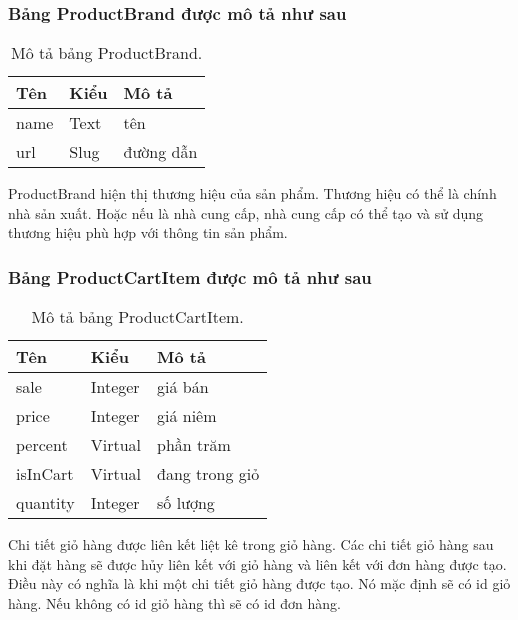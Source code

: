\subsubsection{Bảng ProductBrand được mô tả như sau}
\begin{table}[!htbp]\fontsize{13px}{13px}\selectfont\justifying
\begin{center}
\caption{Mô tả bảng ProductBrand.}
\begin{tabularx}{0.6\textwidth}{ |l|l|X| } 
\hline
Tên & Kiểu & Mô tả \\
\hline
name & Text & tên \\
url & Slug & đường dẫn \\
\hline
\end{tabularx}
\label{table:ProductBrand}
\end{center}
ProductBrand hiện thị thương hiệu của sản phẩm. Thương hiệu có thể là chính nhà sản xuất. Hoặc nếu là nhà cung cấp, nhà cung cấp có thể tạo và sử dụng thương hiệu phù hợp với thông tin sản phẩm.
\end{table}
\clearpage
\subsubsection{Bảng ProductCartItem được mô tả như sau}
\begin{table}[!htbp]\fontsize{13px}{13px}\selectfont\justifying
\begin{center}
\caption{Mô tả bảng ProductCartItem.}
\begin{tabularx}{0.6\textwidth}{ |l|l|X| } 
\hline
Tên & Kiểu & Mô tả \\
\hline
sale & Integer & giá bán \\
price & Integer & giá niêm \\
percent & Virtual & phần trăm \\
isInCart & Virtual & đang trong giỏ \\
quantity & Integer & số lượng \\ 
\hline
\end{tabularx}
\label{table:ProductCartItem}
\end{center}
Chi tiết giỏ hàng được liên kết liệt kê trong giỏ hàng. Các chi tiết giỏ hàng sau khi đặt hàng sẽ được hủy liên kết với giỏ hàng và liên kết với đơn hàng được tạo. Điều này có nghĩa là khi một chi tiết giỏ hàng được tạo. Nó mặc định sẽ có id giỏ hàng. Nếu không có id giỏ hàng thì sẽ có id đơn hàng.
\end{table}

